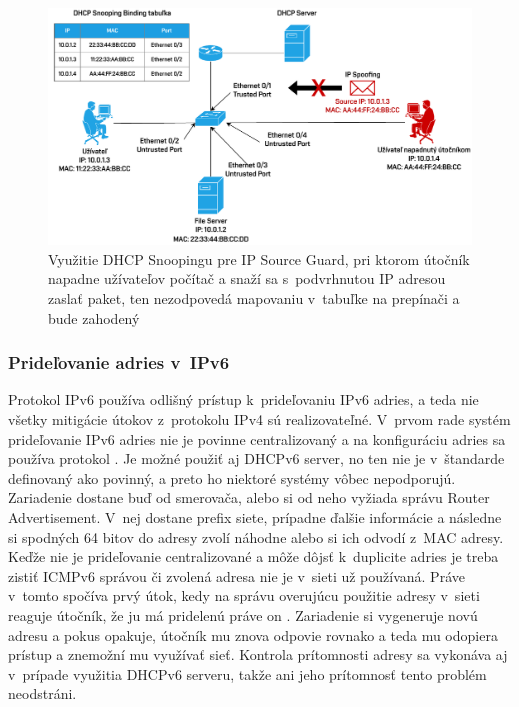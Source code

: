 \begin{figure}[H]
	\begin{center}
		\includegraphics[scale=0.75]{obrazky/dhcp-snoop.pdf}
	\end{center}
	\caption[DHCP Snooping a IP Source Guard]{Využitie DHCP Snoopingu pre IP Source Guard, pri ktorom útočník napadne užívateľov počítač a snaží sa s~podvrhnutou IP adresou zaslať paket, ten nezodpovedá mapovaniu v~tabuľke na prepínači a bude zahodený}
	\label{fig:dhcpsnoop}
\end{figure}    

\subsubsection*{Prideľovanie adries v~IPv6}
Protokol IPv6 používa odlišný prístup k~prideľovaniu IPv6 adries, a teda nie všetky mitigácie útokov z~protokolu IPv4 sú realizovateľné. V~prvom rade systém prideľovanie IPv6 adries nie je povinne centralizovaný a na konfiguráciu adries sa používa protokol . Je možné použiť aj DHCPv6 server, no ten nie je v~štandarde definovaný ako povinný, a preto ho niektoré systémy vôbec nepodporujú. Zariadenie dostane buď od smerovača, alebo si od neho  vyžiada správu Router Advertisement. V~nej dostane prefix siete, prípadne ďalšie informácie a následne si spodných 64 bitov do adresy zvolí náhodne alebo si ich odvodí z~MAC adresy. Keďže nie je prideľovanie centralizované a môže dôjsť k~duplicite adries je treba zistiť ICMPv6 správou či zvolená adresa nie je v~sieti už používaná. Práve v~tomto spočíva prvý útok, kedy na správu overujúcu použitie adresy v~sieti reaguje útočník, že ju má pridelenú práve on \cite{Hg83oflOfHBGeWfs}. Zariadenie si vygeneruje novú adresu a pokus opakuje, útočník mu znova odpovie rovnako a teda mu odopiera prístup a znemožní mu využívať sieť. Kontrola prítomnosti adresy sa vykonáva aj v~prípade využitia DHCPv6 serveru, takže ani jeho prítomnosť tento problém neodstráni. 

